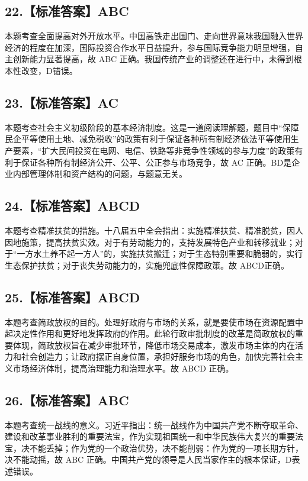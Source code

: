 \documentclass[UTF8,11pt]{ctexart}
\begin{document}
\subsection*{22.【标准答案】ABC}

本题考查全面提高对外开放水平。中国高铁走出国门、走向世界意味我国融入世界经济的程度在加深，国际投资合作水平日益提升，参与国际竞争能力明显增强，自主创新能力显著提高，故 ABC 正确。我国传统产业的调整还在进行中，未得到根本性改变，D错误。


\subsection*{23.【标准答案】AC}

本题考查社会主义初级阶段的基本经济制度。这是一道阅读理解题，题目中“保障民企平等使用土地、减免税收”的政策有利于保证各种所有制经济依法平等使用生产要素，“扩大民间投资在电网、电信、铁路等非竞争性领域的参与力度”的政策有利于保证各种所有制经济公开、公平、公正参与市场竞争，故 AC 正确。BD是企业内部管理体制和资产结构的问题，与题意无关。


\subsection*{24.【标准答案】ABCD}

本题考查精准扶贫的措施。十八届五中全会指出：实施精准扶贫、精准脱贫，因人因地施策，提高扶贫实效。对于有劳动能力的，支持发展特色产业和转移就业；对于“一方水土养不起一方人”的，实施扶贫搬迁；对于生态特别重要和脆弱的，实行生态保护扶贫；对于丧失劳动能力的，实施兜底性保障政策。故 ABCD正确。


\subsection*{25.【标准答案】ABCD}

本题考查简政放权的目的。处理好政府与市场的关系，就是要使市场在资源配置中起决定性作用和更好地发挥政府的作用。此轮行政审批制度的改革是简政放权的重要体现，简政放权旨在减少审批环节，降低市场交易成本，激发市场主体的内在活力和社会创造力；让政府摆正自身位置，承担好服务市场的角色，加快完善社会主义市场经济体制，提高治理能力和治理水平。故 ABCD 正确。


\subsection*{26.【标准答案】ABC}

本题考查统一战线的意义。习近平指出：统一战线作为中国共产党不断夺取革命、建设和改革事业胜利的重要法宝，作为实现祖国统一和中华民族伟大复兴的重要法宝，决不能丢掉；作为党的一个政治优势，决不能削弱：作为党的一项长期方针，决不能动摇，故 ABC 正确。中国共产党的领导是人民当家作主的根本保证，D表述错误。
\end{document}
